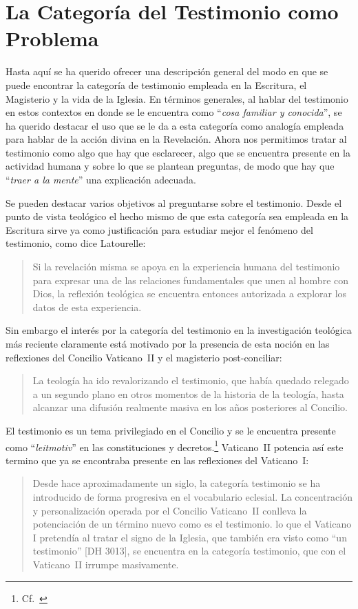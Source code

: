 \section{La Categoría del Testimonio como Problema}

Hasta aquí se ha querido ofrecer una descripción general del modo en que se
puede encontrar la categoría de testimonio empleada en la Escritura, el
Magisterio y la vida de la Iglesia. En términos generales, al hablar del
testimonio en estos contextos en donde se le encuentra como \enquote{\emph{cosa
    familiar y conocida}}, se ha querido destacar el uso que se le da a esta
categoría como analogía empleada para hablar de la acción divina en la
Revelación. Ahora nos permitimos tratar al testimonio como algo que hay que
esclarecer, algo que se encuentra presente en la actividad humana y sobre lo que
se plantean preguntas, de modo que hay que \enquote{\emph{traer a la mente}} una
explicación adecuada.

Se pueden destacar varios objetivos al preguntarse sobre el testimonio. Desde el
punto de vista teológico el hecho mismo de que esta categoría sea empleada en la
Escritura sirve ya como justificación para estudiar mejor el fenómeno del
testimonio, como dice Latourelle:
\blockquote[{\cite[1523]{latourelle2000testimonio}}]{Si la revelación misma se
  apoya en la experiencia humana del testimonio para expresar una de las
  relaciones fundamentales que unen al hombre con Dios, la reflexión teológica
  se encuentra entonces autorizada a explorar los datos de esta experiencia.}
Sin embargo el interés por la categoría del testimonio en la investigación
teológica más reciente claramente está motivado por la presencia de esta noción
en las reflexiones del Concilio Vaticano~II y el magisterio post-conciliar:
\blockquote[{\cite[81]{prades2015testimonio}}]{La teología ha ido revalorizando
  el testimonio, que había quedado relegado a un segundo plano en otros momentos
  de la historia de la teología, hasta alcanzar una difusión realmente masiva en
  los años posteriores al Concilio.}
El testimonio es un tema privilegiado en el Concilio y se le encuentra presente
como \enquote{\emph{leitmotiv}} en las constituciones y
decretos.\footnote{Cf.~\cite[1523]{latourelle2000testimonio}} Vaticano~II
potencia así este termino que ya se encontraba presente en las reflexiones del
Vaticano~I:
\blockquote[{\cite[572]{ninot2009tf}}]{Desde hace aproximadamente un siglo, la
  categoría testimonio se ha introducido de forma progresiva en el vocabulario
  eclesial. La concentración y personalización operada por el Concilio
  Vaticano~II conlleva la potenciación de un término nuevo como es el
  testimonio. \textelp{} lo que el Vaticano I pretendía al tratar el signo de la
  Iglesia, que también era visto como ``un testimonio'' [DH 3013], se encuentra
  en la categoría testimonio, que con el Vaticano~II irrumpe masivamente.}

